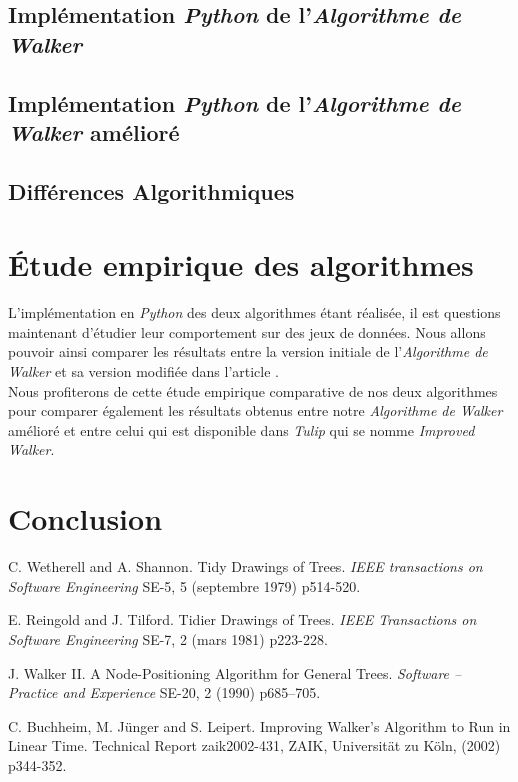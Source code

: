 \documentclass{article}
\begin{document}
\subsection{Implémentation \emph{Python} de l'\emph{Algorithme de Walker} \cite{article90}}

\subsection{Implémentation \emph{Python} de l'\emph{Algorithme de Walker} amélioré \cite{article02}}

\subsection{Différences Algorithmiques}


\newpage
\section{Étude empirique des algorithmes}

L'implémentation en \emph{Python} des deux algorithmes étant réalisée, il est questions maintenant d'étudier leur comportement sur des jeux de données. Nous allons pouvoir ainsi comparer les résultats entre la version initiale de  l'\emph{Algorithme de Walker} et sa version modifiée dans l'article \cite{article02}.\\

Nous profiterons de cette étude empirique comparative de nos deux algorithmes pour comparer également les résultats obtenus entre notre \emph{Algorithme de Walker} amélioré et entre celui qui est disponible dans \emph{Tulip} qui se nomme \emph{Improved Walker}.\\


\newpage
\section{Conclusion}




\newpage
\medskip

\begin{thebibliography}{10}

C. Wetherell and A. Shannon. Tidy Drawings of Trees. \textit{IEEE transactions on Software Engineering} SE-5, 5 (septembre 1979) p514-520.

E. Reingold and J. Tilford. Tidier Drawings of Trees. \textit{IEEE Transactions on Software Engineering} SE-7, 2 (mars 1981) p223-228.

J. Walker II. A Node-Positioning Algorithm for General Trees. \textit{Software – Practice and Experience} SE-20, 2 (1990) p685–705.

C. Buchheim, M. Jünger and S. Leipert. Improving Walker’s Algorithm to Run in Linear Time. Technical Report zaik2002-431, ZAIK, Universität zu Köln, (2002) p344-352.

\end{thebibliography}
\end{document}
